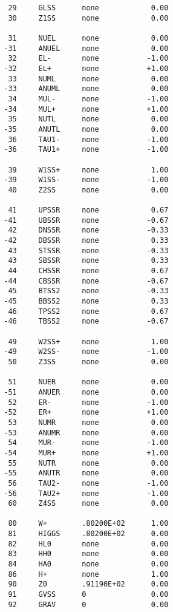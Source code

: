\begin{verbatim}
         29     GLSS      none            0.00
         30     Z1SS      none            0.00

         31     NUEL      none            0.00
        -31     ANUEL     none            0.00
         32     EL-       none           -1.00
        -32     EL+       none           +1.00
         33     NUML      none            0.00
        -33     ANUML     none            0.00
         34     MUL-      none           -1.00
        -34     MUL+      none           +1.00
         35     NUTL      none            0.00
        -35     ANUTL     none            0.00
         36     TAU1-     none           -1.00
        -36     TAU1+     none           -1.00

         39     W1SS+     none            1.00
        -39     W1SS-     none           -1.00
         40     Z2SS      none            0.00

         41     UPSSR     none            0.67
        -41     UBSSR     none           -0.67
         42     DNSSR     none           -0.33
        -42     DBSSR     none            0.33
         43     STSSR     none           -0.33
         43     SBSSR     none            0.33
         44     CHSSR     none            0.67
        -44     CBSSR     none           -0.67
         45     BTSS2     none           -0.33
        -45     BBSS2     none            0.33
         46     TPSS2     none            0.67
        -46     TBSS2     none           -0.67

         49     W2SS+     none            1.00
        -49     W2SS-     none           -1.00
         50     Z3SS      none            0.00

         51     NUER      none            0.00
        -51     ANUER     none            0.00
         52     ER-       none           -1.00
        -52     ER+       none           +1.00
         53     NUMR      none            0.00
        -53     ANUMR     none            0.00
         54     MUR-      none           -1.00
        -54     MUR+      none           +1.00
         55     NUTR      none            0.00
        -55     ANUTR     none            0.00
         56     TAU2-     none           -1.00
        -56     TAU2+     none           -1.00
         60     Z4SS      none            0.00

         80     W+        .80200E+02      1.00
         81     HIGGS     .80200E+02      0.00
         82     HL0       none            0.00
         83     HH0       none            0.00
         84     HA0       none            0.00
         86     H+        none            1.00
         90     Z0        .91190E+02      0.00
         91     GVSS      0               0.00
         92     GRAV      0               0.00



\end{verbatim}
